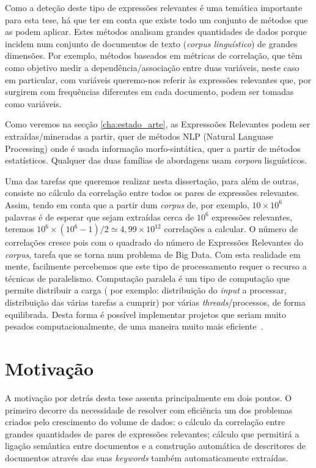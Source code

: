 Como a deteção deste tipo de expressões relevantes é uma temática importante para esta tese, há que ter em conta que existe todo um conjunto de métodos que as podem aplicar. Estes métodos analisam grandes quantidades de dados porque incidem num conjunto de documentos de texto (\textit{corpus linguístico}) de grandes dimensões. Por exemplo, métodos baseados em métricas de correlação, que têm como objetivo medir a dependência/associação entre duas variáveis, neste caso em particular, com variáveis queremo-nos referir às expressões relevantes que, por surgirem com frequências diferentes em cada documento, podem ser tomadas como variáveis.

Como veremos na secção \ref{cha:estado_arte},  as Expressoões Relevantes podem ser extraídas/mineradas a partir, quer de métodos NLP (Natural Languase Processing) onde é usada informação morfo-sintática, quer a partir de métodos estatísticos. Qualquer das duas famílias de abordagens usam \textit{corpora} lisguísticos.  

Uma das tarefas que queremos realizar nesta dissertação, para além de outras, consiste no cálculo da correlação entre todos os pares de expressões relevantes. Assim, tendo em conta que a partir dum \textit{corpus} de, por exemplo, $10\times10^{6}$ palavras é de esperar que sejam extraídas cerca de $10^6$ expressões relevantes, teremos $10^6 \times (10^{6} - 1) / 2 \simeq 4,99 \times 10^{12}$ correlações a calcular. O número de correlações cresce pois com o quadrado do número de Expressões Relevantes do \textit{corpus}, tarefa que se torna num problema de Big Data. Com esta realidade em mente, facilmente percebemos que este tipo de processamento requer o recurso a técnicas de paralelismo. Computação paralela é um tipo de computação que permite distribuir a carga ( por exemplo: distribuição do \textit{input} a processar, distribuição das várias tarefas a cumprir) por várias \textit{threads}/processos, de forma equilibrada. Desta forma é possível implementar projetos que seriam muito pesados computacionalmente, de uma maneira muito mais eficiente~\cite{Almasi1989}.

\section{Motivação} %
\label{sec:motivacao}
A motivação por detrás desta tese assenta principalmente em dois pontos.
O primeiro decorre da necessidade de resolver com eficiência um dos problemas criados pelo crescimento do volume de dados: o cálculo da correlação entre grandes quantidades de pares de expressões relevantes;  cálculo que permitirá a ligação semântica entre documentos e a construção automática de descritores de documentos através das suas \textit{keywords} também automaticamente extraídas.

